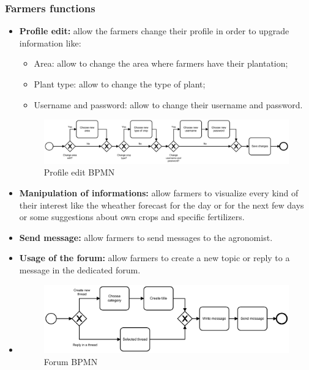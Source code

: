 \documentclass[table, 12pt]{article}
\begin{document}
\subsubsection{Farmers functions}
\begin{itemize}
    \item \textbf{Profile edit: }allow the farmers change their profile in order to upgrade information like: 
    \begin{itemize}
        \item[] Area: allow to change the area where farmers have their plantation;
        \item[] Plant type: allow to change the type of plant;
        \item[] Username and password: allow to change their username and password.
    \end{itemize}
    \begin{center}
        \begin{figure}[!h]
            \includegraphics[width=\textwidth]{assets/BPMN/ProfileEditBpmn}
            \caption{Profile edit BPMN}
            \label{fig: profileedit}
        \end{figure}
    \end{center}
    \item \textbf{Manipulation of informations: }allow farmers to visualize every kind of their interest like the wheather forecast for the day or for the next few days or some suggestions about own crops and specific fertilizers.
    \item \textbf{Send message: }allow farmers to send messages to the agronomist.
    \item \textbf{Usage of the forum: }allow farmers to create a new topic or reply to a message in the dedicated forum.
    \item \begin{center}
        \begin{figure}[!h]
            \includegraphics[width=\textwidth]{assets/BPMN/ForumBpmn}
            \caption{Forum BPMN}
            \label{fig: forum}
        \end{figure}
    \end{center}
\end{itemize}
\end{document}
